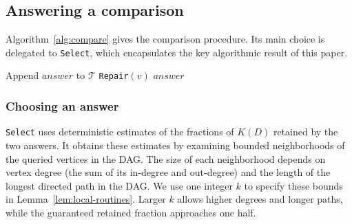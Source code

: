 \subsection{Answering a comparison}\label{sec:comparison}\label{sec:legal}

Algorithm~\ref{alg:compare} gives the comparison procedure. Its main
choice is delegated to \texttt{Select}, which encapsulates the key
algorithmic result of this paper.

\begin{algorithm}[H]
\caption{\texttt{Compare}$(A,B)$: answer a comparison query.}
\label{alg:overview-compare}\label{alg:compare}
\DontPrintSemicolon
{}
Append $\mathit{answer}$ to $\mathcal T$\;
\texttt{Repair}$(v)$\;
\Return $\mathit{answer}$\;
\end{algorithm}

\subsubsection{Choosing an answer}\label{sec:selection}

\texttt{Select} uses deterministic estimates of the fractions of $K(D)$
retained by the two answers. It obtains these estimates by examining
bounded neighborhoods of the queried vertices in the DAG. The size of
each neighborhood depends on vertex degree (the sum of its in-degree and out-degree) and
the length of the longest directed path in the DAG. We use one integer
$k$ to specify these bounds in Lemma~\ref{lem:local-routines}. Larger $k$ allows higher degrees
and longer paths, while the guaranteed retained fraction approaches
one half.

